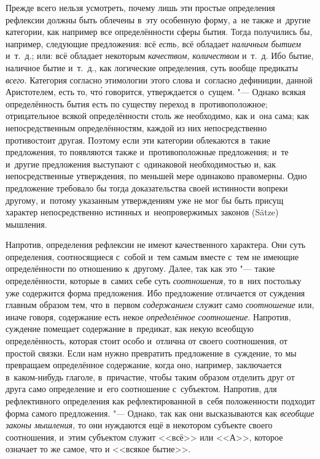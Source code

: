 Прежде всего нельзя усмотреть, почему лишь эти простые определения рефлексии
должны быть облечены в~эту особенную форму, а~не также и~другие категории,
как например все определённости сферы бытия. Тогда получились бы, например,
следующие предложения: всё {\em есть,} всё обладает
{\em наличным бытием} и~т.~д.; или: всё обладает некоторым {\em качеством,}
{\em количеством} и~т.~д. Ибо бытие, наличное бытие
и~т.~д., как логические определения, суть вообще предикаты
{\em всего}. Категория согласно этимологии этого слова
и~согласно дефиниции, данной Аристотелем, есть то, чт\'{о} говорится,
утверждается о~сущем. "--- Однако всякая определённость бытия есть по существу
переход в~противоположное; отрицательное всякой определённости столь же
необходимо, как и~она сама; как непосредственным определённостям, каждой из
них непосредственно противостоит другая. Поэтому если эти категории
облекаются в~такие предложения, то появляются также и~противоположные
предложения; и~те и~другие предложения выступают с~одинаковой
необходимостью и, как непосредственные утверждения, по меньшей мере
одинаково правомерны. Одно предложение требовало бы тогда доказательства
своей истинности вопреки другому, и~потому указанным утверждениям уже не
мог бы быть присущ характер непосредственно истинных и~неопровержимых
законов (Sätze) мышления.

Напротив, определения рефлексии не имеют качественного характера. Они суть
определения, соотносящиеся с~собой и~тем самым вместе с~тем не имеющие
определённости по отношению к~другому. Далее, так как это "--- такие
определённости, которые в~самих себе суть
{\em соотношения,} то в~них постольку уже содержится
форма предложения. Ибо предложение отличается от суждения главным образом
тем, что в~первом {\em содержанием} служит само
{\em соотношение} или, иначе говоря, содержание есть
некое {\em определённое соотношение}. Напротив,
суждение помещает содержание в~предикат, как некую всеобщую определённость,
которая стоит особо и~отлична от своего соотношения, от простой связки.
Если нам нужно превратить предложение в~суждение, то мы превращаем
определённое содержание, когда оно, например, заключается в~каком-нибудь
глаголе, в~причастие, чтобы таким образом отделить друг от друга само
определение и~его соотношение с~субъектом. Напротив, для рефлективного
определения как рефлектированной в~себя положенности подходит форма самого
предложения. "--- Однако, так как они высказываются как
{\em всеобщие законы мышления,} то они нуждаются ещё в
некотором субъекте своего соотношения, и~этим субъектом служит <<всё>> или
<<$А$>>, которое означает то же самое, что и <<всякое бытие>>.

